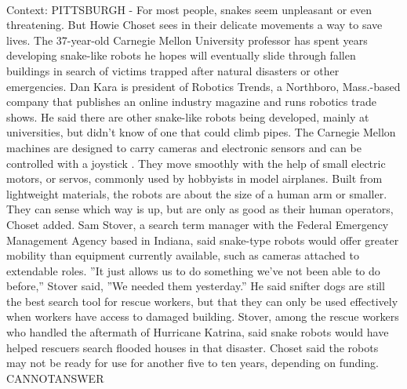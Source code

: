 \documentclass[11pt,a4paper, onecolumn]{article}
\begin{document}
\\ Context: PITTSBURGH - For most people, snakes seem unpleasant or even threatening. But Howie Choset sees in their delicate movements a way to save lives. The 37-year-old Carnegie Mellon University professor has spent years developing snake-like robots he hopes will eventually slide through fallen buildings in search of victims trapped after natural disasters or other emergencies. Dan Kara is president of Robotics Trends, a Northboro, Mass.-based company that publishes an online industry magazine and runs robotics trade shows. He said there are other snake-like robots being developed, mainly at universities, but didn't know of one that could climb pipes. The Carnegie Mellon machines are designed to carry cameras and electronic sensors and can be controlled with a joystick . They move smoothly with the help of small electric motors, or servos, commonly used by hobbyists in model airplanes. Built from lightweight materials, the robots are about the size of a human arm or smaller. They can sense which way is up, but are only as good as their human operators, Choset added. Sam Stover, a search term manager with the Federal Emergency Management Agency based in Indiana, said snake-type robots would offer greater mobility than equipment currently available, such as cameras attached to extendable roles. ''It just allows us to do something we've not been able to do before,'' Stover said, ''We needed them yesterday.'' He said snifter dogs are still the best search tool for rescue workers, but that they can only be used effectively when workers have access to damaged building. Stover, among the rescue workers who handled the aftermath of Hurricane Katrina, said snake robots would have helped rescuers search flooded houses in that disaster. Choset said the robots may not be ready for use for another five to ten years, depending on funding. CANNOTANSWER
\end{document}
